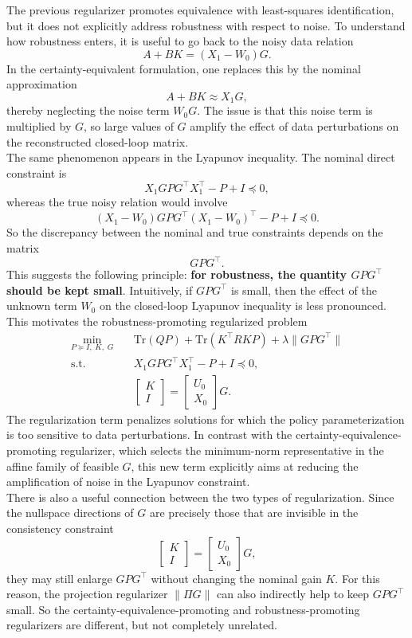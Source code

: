 The previous regularizer promotes equivalence with least-squares identification, but it does not
explicitly address robustness with respect to noise. To understand how robustness enters, it is
useful to go back to the noisy data relation
\[
A+BK = (X_1-W_0)G.
\]
In the certainty-equivalent formulation, one replaces this by the nominal approximation
\[
A+BK \approx X_1G,
\]
thereby neglecting the noise term $W_0G$. The issue is that this noise term is multiplied by
$G$, so large values of $G$ amplify the effect of data perturbations on the reconstructed
closed-loop matrix.\\
The same phenomenon appears in the Lyapunov inequality. The nominal direct constraint is
\[
X_1GPG^\top X_1^\top - P + I \preceq 0,
\]
whereas the true noisy relation would involve
\[
(X_1-W_0)GPG^\top (X_1-W_0)^\top - P + I \preceq 0.
\]
So the discrepancy between the nominal and true constraints depends on the matrix
\[
GPG^\top.
\]
This suggests the following principle: \textbf{for robustness, the quantity $GPG^\top$ should be
kept small}. Intuitively, if $GPG^\top$ is small, then the effect of the unknown term $W_0$ on
the closed-loop Lyapunov inequality is less pronounced.\\
This motivates the robustness-promoting regularized problem
\[
\begin{aligned}
\min_{P \succeq I,\;K,\;G}\quad
& \text{Tr}(QP)+\text{Tr}(K^\top RKP)+\lambda \|GPG^\top\| \\
\text{s.t.}\quad
& X_1GPG^\top X_1^\top - P + I \preceq 0,\\
& \begin{bmatrix}
K\\[0.3em]
I
\end{bmatrix}
=
\begin{bmatrix}
U_0\\[0.3em]
X_0
\end{bmatrix}G.
\end{aligned}
\]
The regularization term penalizes solutions for which the policy parameterization is too
sensitive to data perturbations. In contrast with the certainty-equivalence-promoting regularizer,
which selects the minimum-norm representative in the affine family of feasible $G$, this new
term explicitly aims at reducing the amplification of noise in the Lyapunov constraint.\\

There is also a useful connection between the two types of regularization. Since the nullspace
directions of $G$ are precisely those that are invisible in the consistency constraint
\[
\begin{bmatrix}
K\\[0.3em]
I
\end{bmatrix}
=
\begin{bmatrix}
U_0\\[0.3em]
X_0
\end{bmatrix}G,
\]
they may still enlarge $GPG^\top$ without changing the nominal gain $K$. For this reason, the
projection regularizer $\|\Pi G\|$ can also indirectly help to keep $GPG^\top$ small. So the
certainty-equivalence-promoting and robustness-promoting regularizers are different, but not
completely unrelated.

